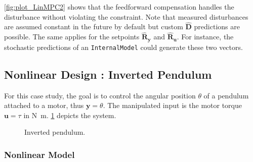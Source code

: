 \cref{fig:plot_LinMPC2} shows that the feedforward compensation handles the disturbance without violating the constraint. Note that measured disturbances are assumed constant in the future by default but custom $\mathbf{\hat{D}}$ predictions are possible. The same applies for the setpoints $\mathbf{\hat{R}_y}$ and $\mathbf{\hat{R}_u}$. For instance, the stochastic predictions of an \texttt{InternalModel} could generate these two vectors.

\subsection{Nonlinear Design : Inverted Pendulum}
\label{sec.nonlinear_design}

For this case study, the goal is to control the angular position $\theta$ of a pendulum attached to a motor, thus $\mathbf{y} = \theta$. The manipulated input is the motor torque $\mathbf{u} = \tau$ in \si{\newton\meter}. \cref{fig:pendulum} depicts the system. 

\begin{figure}[ht]
    \centering
    
    \caption{Inverted pendulum.}\label{fig:pendulum}
\end{figure}

\subsubsection{Nonlinear Model}

